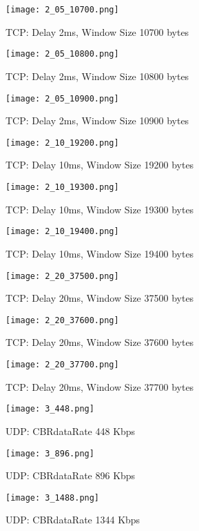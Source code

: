 \documentclass[12pt, fleqn]{article}
\begin{document}
\begin{figure}[H]
    \centering
    \texttt{[image: 2\_05\_10700.png]}
    \caption{TCP: Delay 2ms, Window Size 10700 bytes}
\end{figure}
 \begin{figure}[H]
    \centering
    \texttt{[image: 2\_05\_10800.png]}
    \caption{TCP: Delay 2ms, Window Size 10800 bytes}
\end{figure}
\begin{figure}[H]
    \centering
    \texttt{[image: 2\_05\_10900.png]}
        \caption{TCP: Delay 2ms, Window Size 10900 bytes}
\end{figure}
\begin{figure}[H]
    \centering
    \texttt{[image: 2\_10\_19200.png]}
    \caption{TCP: Delay 10ms, Window Size 19200 bytes}
\end{figure}
\begin{figure}[H]
    \centering
    \texttt{[image: 2\_10\_19300.png]}
    \caption{TCP: Delay 10ms, Window Size 19300 bytes}
\end{figure}
\begin{figure}[H]
    \centering
    \texttt{[image: 2\_10\_19400.png]}
    \caption{TCP: Delay 10ms, Window Size 19400 bytes}
\end{figure}
\begin{figure}[H]
    \centering
    \texttt{[image: 2\_20\_37500.png]}
    \caption{TCP: Delay 20ms, Window Size 37500 bytes}
\end{figure}
\begin{figure}[H]
    \centering
    \texttt{[image: 2\_20\_37600.png]}
    \caption{TCP: Delay 20ms, Window Size 37600 bytes}
\end{figure}
\begin{figure}[H]
    \centering
    \texttt{[image: 2\_20\_37700.png]}
    \caption{TCP: Delay 20ms, Window Size 37700 bytes}
\end{figure}
\begin{figure}[H]
    \centering
    \texttt{[image: 3\_448.png]}
    \caption{UDP: CBRdataRate 448 Kbps}
\end{figure}
\begin{figure}[H]
    \centering
    \texttt{[image: 3\_896.png]}
    \caption{UDP: CBRdataRate 896 Kbps}
\end{figure}
\begin{figure}[H]
    \centering
    \texttt{[image: 3\_1488.png]}
    \caption{UDP: CBRdataRate 1344 Kbps}
\end{figure}
\end{document}
